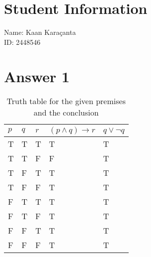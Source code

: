 \documentclass[12pt]{article}
\begin{document}
\section*{Student Information}

Name: Kaan Karaçanta \\

ID: 2448546 \\



\section*{Answer 1}

\begin{table}[H]
    \centering
    \begin{tabular}{|l|l|l|l|l|}
        \hline
        $p$ & $q$ & $r$ & $ (p \wedge q) \rightarrow r  $ & $ q \vee \neg q $ \\ \hline
        T   & T   & T   & T                               & T                 \\ \hline
        T   & T   & F   & F                               & T                 \\ \hline
        T   & F   & T   & T                               & T                 \\ \hline
        T   & F   & F   & T                               & T                 \\ \hline
        F   & T   & T   & T                               & T                 \\ \hline
        F   & T   & F   & T                               & T                 \\ \hline
        F   & F   & T   & T                               & T                 \\ \hline
        F   & F   & F   & T                               & T                 \\ \hline
    \end{tabular}

    \caption{Truth table for the given premises and the conclusion}
    \label{t1}
\end{table}
\end{document}
